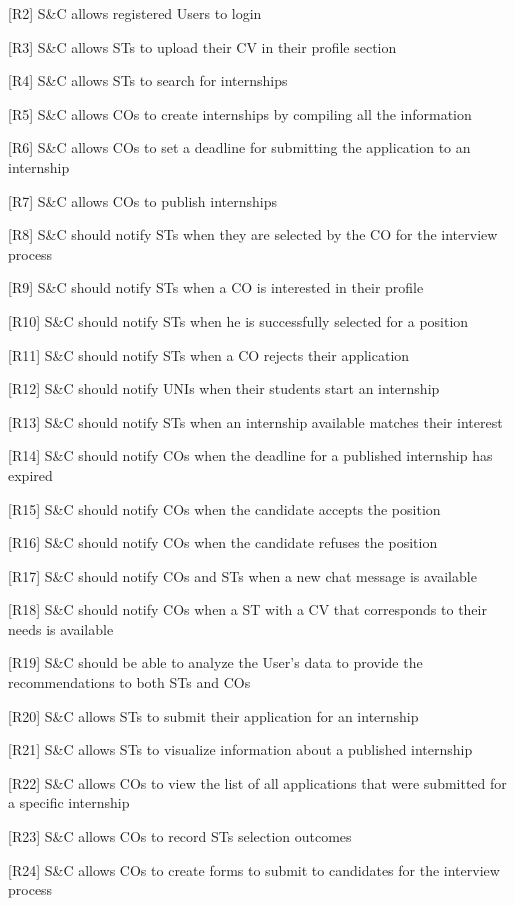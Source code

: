 [R2] S\&C allows registered Users to login	

[R3] S\&C allows STs to upload their CV in their profile section

[R4] S\&C allows STs to search for internships

[R5] S\&C allows COs to create internships by compiling all the information

[R6] S\&C allows COs to set a deadline for submitting the application to an internship

[R7] S\&C allows COs to publish internships

[R8] S\&C should notify STs when they are selected by the CO for the interview process

[R9] S\&C should notify STs when a CO is interested in their profile

[R10] S\&C should notify STs when he is successfully selected for a position

[R11] S\&C should notify STs when a CO rejects their application

[R12] S\&C should notify UNIs when their students start an internship

[R13] S\&C should notify STs when an internship available matches their interest

[R14] S\&C should notify COs when the deadline for a published internship has expired

[R15] S\&C should notify COs when the candidate accepts the position

[R16] S\&C should notify COs when the candidate refuses the position

[R17] S\&C should notify COs and STs when a new chat message is available

[R18] S\&C should notify COs when a ST with a CV that corresponds to their needs is available

[R19] S\&C should be able to analyze the User’s data to provide the recommendations to both STs and COs

[R20] S\&C allows STs to submit their application for an internship	

[R21] S\&C allows STs to visualize information about a published internship

[R22] S\&C allows COs to view the list of all applications that were submitted for a specific internship

[R23] S\&C allows COs to record STs selection outcomes

[R24] S\&C allows COs to create forms to submit to candidates for the interview process

